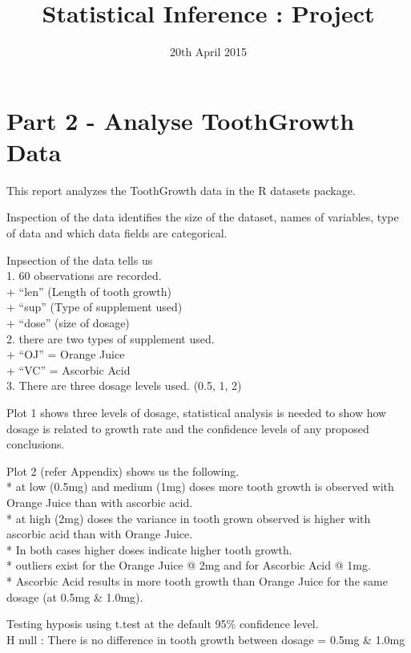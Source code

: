 \documentclass[]{article}
\title{Statistical Inference : Project}
\author{}
\date{20th April 2015}
\begin{document}
\maketitle


\section{Part 2 - Analyse ToothGrowth
Data}\label{part-2---analyse-toothgrowth-data}

This report analyzes the ToothGrowth data in the R datasets package.

Inspection of the data identifies the size of the dataset, names of
variables, type of data and which data fields are categorical.

Inpsection of the data tells us\\1. 60 observations are recorded.\\ +
``len'' (Length of tooth growth)\\ + ``sup'' (Type of supplement used)\\
+ ``dose'' (size of dosage)\\2. there are two types of supplement
used.\\ + ``OJ'' = Orange Juice\\ + ``VC'' = Ascorbic Acid\\3. There are
three dosage levels used. (0.5, 1, 2)

Plot 1 shows three levels of dosage, statistical analysis is needed to
show how dosage is related to growth rate and the confidence levels of
any proposed conclusions.

Plot 2 (refer Appendix) shows us the following.\\* at low (0.5mg) and
medium (1mg) doses more tooth growth is observed with Orange Juice than
with ascorbic acid.\\* at high (2mg) doses the variance in tooth grown
observed is higher with ascorbic acid than with Orange Juice.\\* In both
cases higher doses indicate higher tooth growth.\\* outliers exist for
the Orange Juice @ 2mg and for Ascorbic Acid @ 1mg.\\* Ascorbic Acid
results in more tooth growth than Orange Juice for the same dosage (at
0.5mg \& 1.0mg).

Testing hyposis using t.test at the default 95\% confidence level.\\H
null : There is no difference in tooth growth between dosage = 0.5mg \&
1.0mg
\end{document}
